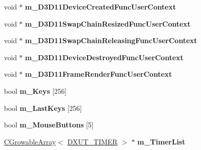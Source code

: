 \begin{DoxyCompactItemize}
\item 
\hypertarget{struct_d_x_u_t_state_1_1_s_t_a_t_e_a0288a61b4424949215b7766edcd66c49}{void $\ast$ {\bfseries m\+\_\+\+D3\+D11\+Device\+Created\+Func\+User\+Context}}\label{struct_d_x_u_t_state_1_1_s_t_a_t_e_a0288a61b4424949215b7766edcd66c49}

\item 
\hypertarget{struct_d_x_u_t_state_1_1_s_t_a_t_e_aaded533fed701d27ccaa92d75c13848d}{void $\ast$ {\bfseries m\+\_\+\+D3\+D11\+Swap\+Chain\+Resized\+Func\+User\+Context}}\label{struct_d_x_u_t_state_1_1_s_t_a_t_e_aaded533fed701d27ccaa92d75c13848d}

\item 
\hypertarget{struct_d_x_u_t_state_1_1_s_t_a_t_e_a54bdf6cd92f60c61f365f8777cc8fcf0}{void $\ast$ {\bfseries m\+\_\+\+D3\+D11\+Swap\+Chain\+Releasing\+Func\+User\+Context}}\label{struct_d_x_u_t_state_1_1_s_t_a_t_e_a54bdf6cd92f60c61f365f8777cc8fcf0}

\item 
\hypertarget{struct_d_x_u_t_state_1_1_s_t_a_t_e_a232ec74c3b2a71f22713a7db78a85c94}{void $\ast$ {\bfseries m\+\_\+\+D3\+D11\+Device\+Destroyed\+Func\+User\+Context}}\label{struct_d_x_u_t_state_1_1_s_t_a_t_e_a232ec74c3b2a71f22713a7db78a85c94}

\item 
\hypertarget{struct_d_x_u_t_state_1_1_s_t_a_t_e_ac4c77e40e7c2e5a4de28f921ccb762a2}{void $\ast$ {\bfseries m\+\_\+\+D3\+D11\+Frame\+Render\+Func\+User\+Context}}\label{struct_d_x_u_t_state_1_1_s_t_a_t_e_ac4c77e40e7c2e5a4de28f921ccb762a2}

\item 
\hypertarget{struct_d_x_u_t_state_1_1_s_t_a_t_e_a55465563b5a34df8c923c1ed0c169c9a}{bool {\bfseries m\+\_\+\+Keys} \mbox{[}256\mbox{]}}\label{struct_d_x_u_t_state_1_1_s_t_a_t_e_a55465563b5a34df8c923c1ed0c169c9a}

\item 
\hypertarget{struct_d_x_u_t_state_1_1_s_t_a_t_e_a34996635189cb7afc9ef4e02306aef96}{bool {\bfseries m\+\_\+\+Last\+Keys} \mbox{[}256\mbox{]}}\label{struct_d_x_u_t_state_1_1_s_t_a_t_e_a34996635189cb7afc9ef4e02306aef96}

\item 
\hypertarget{struct_d_x_u_t_state_1_1_s_t_a_t_e_a6e494c7c6eb55ee3ad56a53325b679d4}{bool {\bfseries m\+\_\+\+Mouse\+Buttons} \mbox{[}5\mbox{]}}\label{struct_d_x_u_t_state_1_1_s_t_a_t_e_a6e494c7c6eb55ee3ad56a53325b679d4}

\item 
\hypertarget{struct_d_x_u_t_state_1_1_s_t_a_t_e_a044d4d33534c19e0fdb1d4f69185679f}{\hyperlink{class_c_growable_array}{C\+Growable\+Array}$<$ \hyperlink{struct_d_x_u_t___t_i_m_e_r}{D\+X\+U\+T\+\_\+\+T\+I\+M\+E\+R} $>$ $\ast$ {\bfseries m\+\_\+\+Timer\+List}}\label{struct_d_x_u_t_state_1_1_s_t_a_t_e_a044d4d33534c19e0fdb1d4f69185679f}


\end{DoxyCompactItemize}
